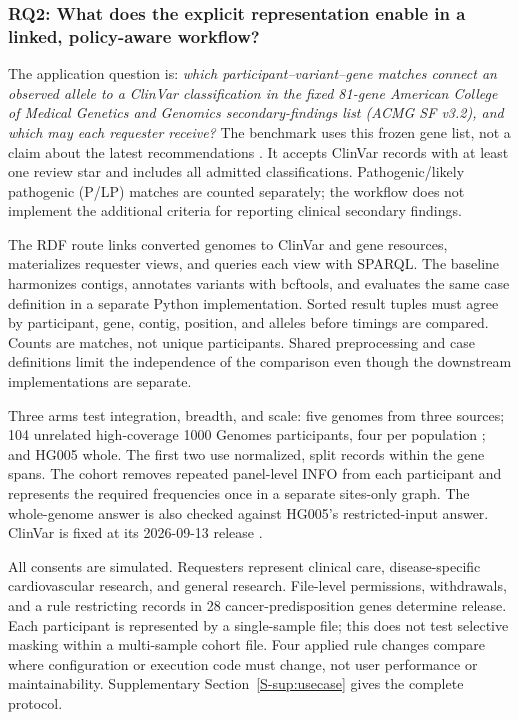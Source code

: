\documentclass[pdflatex,sn-mathphys-num]{sn-jnl}
\begin{document}
\subsubsection{RQ2: What does the explicit representation enable in a linked, policy-aware workflow?}\label{subsec:usecase-design}
The application question is: \emph{which participant--variant--gene matches connect an observed allele to a ClinVar classification in the fixed 81-gene American College of Medical Genetics and Genomics secondary-findings list (ACMG SF v3.2), and which may each requester receive?} 
The benchmark uses this frozen gene list, not a claim about the latest recommendations \cite{miller2023acmg}. 
It accepts ClinVar records with at least one review star and includes all admitted classifications. 
Pathogenic/likely pathogenic (P/LP) matches are counted separately; the workflow does not implement the additional criteria for reporting clinical secondary findings.

The RDF route links converted genomes to ClinVar and gene resources, materializes requester views, and queries each view with SPARQL. 
The baseline harmonizes contigs, annotates variants with bcftools, and evaluates the same case definition in a separate Python implementation. 
Sorted result tuples must agree by participant, gene, contig, position, and alleles before timings are compared. 
Counts are matches, not unique participants. 
Shared preprocessing and case definitions limit the independence of the comparison even though the downstream implementations are separate.

Three arms test integration, breadth, and scale: five genomes from three sources; 104 unrelated high-coverage 1000 Genomes participants, four per population \cite{byrska2022highcoverage}; and HG005 whole. 
The first two use normalized, split records within the gene spans. 
The cohort removes repeated panel-level INFO from each participant and represents the required frequencies once in a separate sites-only graph. 
The whole-genome answer is also checked against HG005's restricted-input answer. 
ClinVar is fixed at its 2026-09-13 release \cite{clinvar_vcf}.

All consents are simulated. 
Requesters represent clinical care, disease-specific cardiovascular research, and general research. 
File-level permissions, withdrawals, and a rule restricting records in 28 cancer-predisposition genes determine release. 
Each participant is represented by a single-sample file; this does not test selective masking within a multi-sample cohort file. 
Four applied rule changes compare where configuration or execution code must change, not user performance or maintainability. 
Supplementary Section~\ref{S-sup:usecase} gives the complete protocol.
\end{document}

